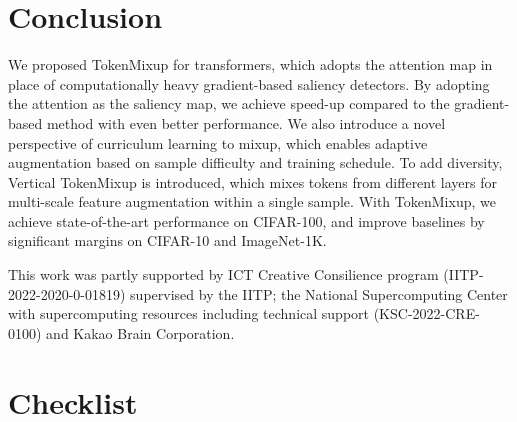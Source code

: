 \documentclass{article}
\begin{document}
  \vspace{-2mm}
\section{Conclusion}
\vspace{-3mm}
We proposed TokenMixup for transformers, which adopts the attention map in place of computationally heavy gradient-based saliency detectors.
By adopting the attention as the saliency map, we achieve  speed-up compared to the gradient-based method with even better performance.
We also introduce a novel perspective of curriculum learning to mixup, which enables adaptive augmentation based on sample difficulty and training schedule.
To add diversity, Vertical TokenMixup is introduced, which mixes tokens from different layers for multi-scale feature augmentation within a single sample.
With TokenMixup, we achieve state-of-the-art performance on CIFAR-100, and improve baselines by significant margins on CIFAR-10 and ImageNet-1K. 



\begin{ack}
This work was partly supported by ICT Creative Consilience program (IITP-2022-2020-0-01819) supervised by the IITP; the National Supercomputing Center with
supercomputing resources including technical support (KSC-2022-CRE-0100) and Kakao Brain Corporation.
\end{ack}


%
 

{\small

}
\newpage

\section*{Checklist}
\end{document}
